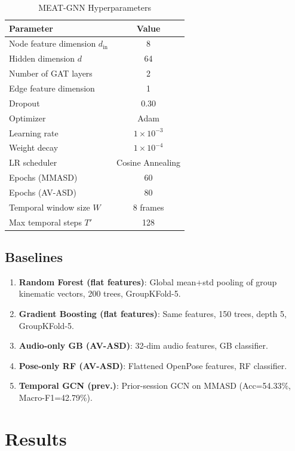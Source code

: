 \documentclass[conference]{IEEEtran}
\begin{document}
\begin{table}[h!]
\centering
\caption{MEAT-GNN Hyperparameters}
\begin{tabular}{lc}
\toprule
\textbf{Parameter} & \textbf{Value} \\
\midrule
Node feature dimension $d_{\text{in}}$ & 8 \\
Hidden dimension $d$ & 64 \\
Number of GAT layers & 2 \\
Edge feature dimension & 1 \\
Dropout & 0.30 \\
Optimizer & Adam \\
Learning rate & $1 \times 10^{-3}$ \\
Weight decay & $1 \times 10^{-4}$ \\
LR scheduler & Cosine Annealing \\
Epochs (MMASD) & 60 \\
Epochs (AV-ASD) & 80 \\
Temporal window size $W$ & 8 frames \\
Max temporal steps $T'$ & 128 \\
\bottomrule
\end{tabular}
\end{table}

\subsection{Baselines}
\begin{enumerate}
  \item \textbf{Random Forest (flat features)}: Global mean+std pooling of group 
        kinematic vectors, 200 trees, GroupKFold-5.
  \item \textbf{Gradient Boosting (flat features)}: Same features, 150 trees, 
        depth 5, GroupKFold-5.
  \item \textbf{Audio-only GB (AV-ASD)}: 32-dim audio features, GB classifier.
  \item \textbf{Pose-only RF (AV-ASD)}: Flattened OpenPose features, RF classifier.
  \item \textbf{Temporal GCN (prev.)}: Prior-session GCN on MMASD 
        (Acc=54.33\%, Macro-F1=42.79\%).
\end{enumerate}

\section{Results}
\label{sec:results}
\end{document}

